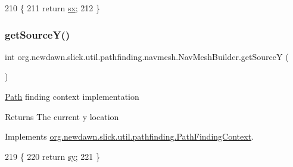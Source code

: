 \begin{DoxyCode}
210                             \{
211         \textcolor{keywordflow}{return} \mbox{\hyperlink{classorg_1_1newdawn_1_1slick_1_1util_1_1pathfinding_1_1navmesh_1_1_nav_mesh_builder_aedfa8227f2b8b06cdb90ca23da209988}{sx}};
212     \}
\end{DoxyCode}
\mbox{\label{classorg_1_1newdawn_1_1slick_1_1util_1_1pathfinding_1_1navmesh_1_1_nav_mesh_builder_af86bf1e346eb82762f69a1d4de6ba315}} 
\subsubsection{\texorpdfstring{get\+Source\+Y()}{getSourceY()}}
{\footnotesize\ttfamily int org.\+newdawn.\+slick.\+util.\+pathfinding.\+navmesh.\+Nav\+Mesh\+Builder.\+get\+SourceY (\begin{DoxyParamCaption}{ }\end{DoxyParamCaption})\hspace{0.3cm}{\ttfamily [inline]}}

\mbox{\hyperlink{classorg_1_1newdawn_1_1slick_1_1util_1_1pathfinding_1_1_path}{Path}} finding context implementation

\begin{DoxyReturn}{Returns}
The current y location 
\end{DoxyReturn}


Implements \mbox{\hyperlink{interfaceorg_1_1newdawn_1_1slick_1_1util_1_1pathfinding_1_1_path_finding_context_a30ac68532d0f3e9e5f4ce5e5e88f593e}{org.\+newdawn.\+slick.\+util.\+pathfinding.\+Path\+Finding\+Context}}.


\begin{DoxyCode}
219                             \{
220         \textcolor{keywordflow}{return} \mbox{\hyperlink{classorg_1_1newdawn_1_1slick_1_1util_1_1pathfinding_1_1navmesh_1_1_nav_mesh_builder_af66e210bbd7a345389ad00afc3aab345}{sy}};
221     \}
\end{DoxyCode}
\mbox{\label{classorg_1_1newdawn_1_1slick_1_1util_1_1pathfinding_1_1navmesh_1_1_nav_mesh_builder_a56bf623a655031fe106b9bdb7e2216b8}} 
